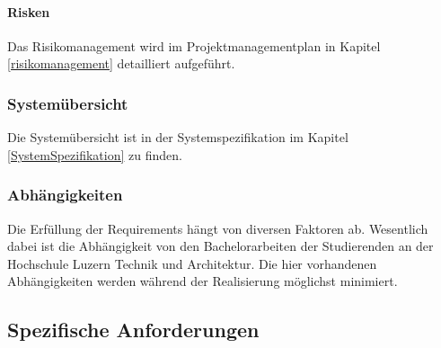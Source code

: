 \paragraph{Risken}
Das Risikomanagement wird im Projektmanagementplan in Kapitel \ref{risikomanagement} detailliert aufgeführt. 
\subsubsection{Systemübersicht}
Die Systemübersicht ist in der Systemspezifikation im Kapitel \ref{SystemSpezifikation} zu finden. 
\subsubsection{Abhängigkeiten}
Die Erfüllung der Requirements hängt von diversen Faktoren ab. Wesentlich dabei ist die Abhängigkeit von den Bachelorarbeiten der Studierenden an der Hochschule Luzern Technik und Architektur. Die hier vorhandenen Abhängigkeiten werden während der Realisierung möglichst minimiert. 
\subsection{Spezifische Anforderungen}

